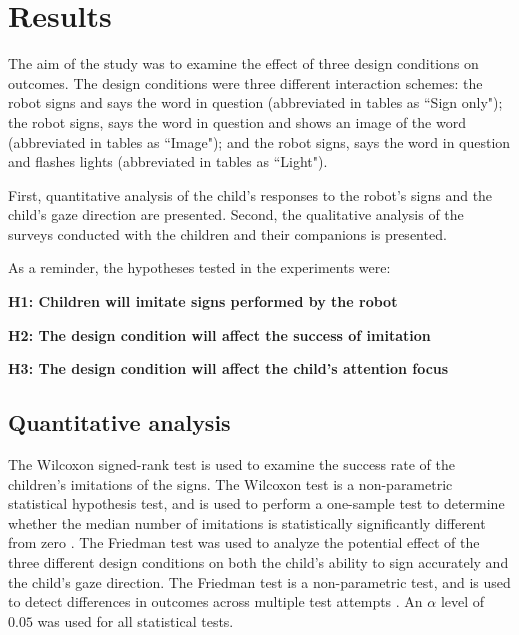 \chapter{Results}
\label{chapter:results}

The aim of the study was to examine the effect of three design conditions on outcomes. The design conditions were three different interaction schemes: the robot signs and says the word in question (abbreviated in tables as ``Sign only"); the robot signs, says the word in question and shows an image of the word (abbreviated in tables as ``Image"); and the robot signs, says the word in question and flashes lights (abbreviated in tables as ``Light").

First, quantitative analysis of the child's responses to the robot's signs and the child's gaze direction are presented. Second, the qualitative analysis of the surveys conducted with the children and their companions is presented.

As a reminder, the hypotheses tested in the experiments were:
\vspace{3mm}

\noindent\textbf{H1: Children will imitate signs performed by the robot}
\vspace{3mm}

\noindent\textbf{H2: The design condition will affect the success of imitation}
\vspace{3mm}

\noindent\textbf{H3: The design condition will affect the child's attention focus}
\vspace{3mm}




\section{Quantitative analysis}

The Wilcoxon signed-rank test is used to examine the success rate of the children's imitations of the signs. The Wilcoxon test is a non-parametric statistical hypothesis test, and is used to perform a one-sample test to determine whether the median number of imitations is statistically significantly different from zero \cite{wilcoxon1945individual}. The Friedman test was used to analyze the potential effect of the three different design conditions on both the child's ability to sign accurately and the child's gaze direction. The Friedman test is a non-parametric test, and is used to detect differences in outcomes across multiple test attempts \cite{friedman1937use}. An $\alpha$ level of $0.05$ was used for all statistical tests.


